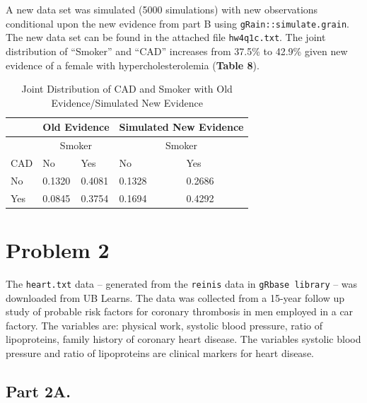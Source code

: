 \documentclass[]{article}
\begin{document}
A new data set was simulated (5000 simulations) with new observations
conditional upon the new evidence from part B using
\texttt{gRain::simulate.grain}. The new data set can be found in the
attached file \texttt{hw4q1c.txt}. The joint distribution of ``Smoker''
and ``CAD'' increases from 37.5\% to 42.9\% given new evidence of a
female with hypercholesterolemia (\textbf{Table 8}).

\begin{table}[]
\centering
\label{my-label}
\begin{tabular}{|l|l|l|l|l|}
\hline
       & \multicolumn{2}{|c|}{Old Evidence} & \multicolumn{2}{|c|}{Simulated New Evidence} \\ \hline
       & \multicolumn{2}{|c|}{Smoker}       & \multicolumn{2}{|c|}{Smoker} \\ \hline
CAD    & No                                 & Yes    & No     & Yes      \\ \hline
No     & 0.1320                             & 0.4081 & 0.1328 & 0.2686 \\ \hline
Yes    & 0.0845                             & 0.3754 & 0.1694 & 0.4292 \\ \hline
\end{tabular}
\caption{Joint Distribution of CAD and Smoker with Old Evidence/Simulated New Evidence}
\end{table}

\newpage 

\section{Problem 2}\label{problem-2}

The \texttt{heart.txt} data -- generated from the \texttt{reinis} data
in \texttt{gRbase library} -- was downloaded from UB Learns. The data
was collected from a 15-year follow up study of probable risk factors
for coronary thrombosis in men employed in a car factory. The variables
are: physical work, systolic blood pressure, ratio of lipoproteins,
family history of coronary heart disease. The variables systolic blood
pressure and ratio of lipoproteins are clinical markers for heart
disease.

\subsection{Part 2A.}\label{part-2a.}
\end{document}
